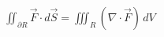 \documentclass[preview]{standalone}
\begin{document}
\begin{align*}
\iint_{\partial R} \vec{F} \cdot d\vec{S} = \iiint_{R} (\nabla \cdot \vec{F})\, dV
\end{align*}
\end{document}
